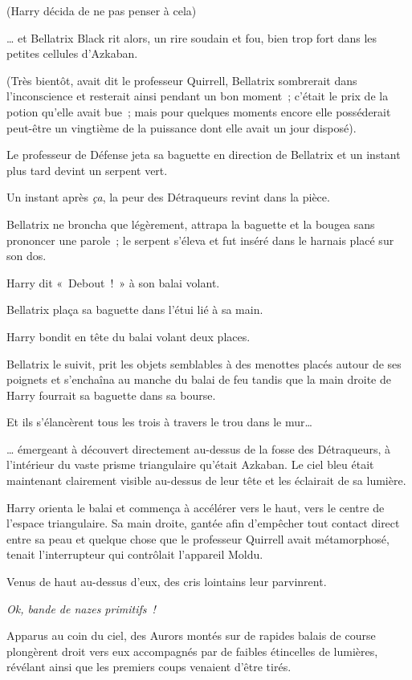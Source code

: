 (Harry décida de ne pas penser à cela)

… et Bellatrix Black rit alors, un rire soudain et fou, bien trop fort dans les petites cellules d'Azkaban.

(Très bientôt, avait dit le professeur Quirrell, Bellatrix sombrerait dans l'inconscience et resterait ainsi pendant un bon moment~; c'était le prix de la potion qu'elle avait bue~; mais pour quelques moments encore elle posséderait peut-être un vingtième de la puissance dont elle avait un jour disposé).

Le professeur de Défense jeta sa baguette en direction de Bellatrix et un instant plus tard devint un serpent vert.

Un instant après \emph{ça}, la peur des Détraqueurs revint dans la pièce.

Bellatrix ne broncha que légèrement, attrapa la baguette et la bougea sans prononcer une parole~; le serpent s'éleva et fut inséré dans le harnais placé sur son dos.

Harry dit «~Debout~!~» à son balai volant.

Bellatrix plaça sa baguette dans l'étui lié à sa main.

Harry bondit en tête du balai volant deux places.

Bellatrix le suivit, prit les objets semblables à des menottes placés autour de ses poignets et s'enchaîna au manche du balai de feu tandis que la main droite de Harry fourrait sa baguette dans sa bourse.

Et ils s'élancèrent tous les trois à travers le trou dans le mur…

… émergeant à découvert directement au-dessus de la fosse des Détraqueurs, à l'intérieur du vaste prisme triangulaire qu'était Azkaban. Le ciel bleu était maintenant clairement visible au-dessus de leur tête et les éclairait de sa lumière.

Harry orienta le balai et commença à accélérer vers le haut, vers le centre de l'espace triangulaire. Sa main droite, gantée afin d'empêcher tout contact direct entre sa peau et quelque chose que le professeur Quirrell avait métamorphosé, tenait l'interrupteur qui contrôlait l'appareil Moldu.

Venus de haut au-dessus d'eux, des cris lointains leur parvinrent.

\emph{Ok, bande de nazes primitifs~!}

Apparus au coin du ciel, des Aurors montés sur de rapides balais de course plongèrent droit vers eux accompagnés par de faibles étincelles de lumières, révélant ainsi que les premiers coups venaient d'être tirés.

